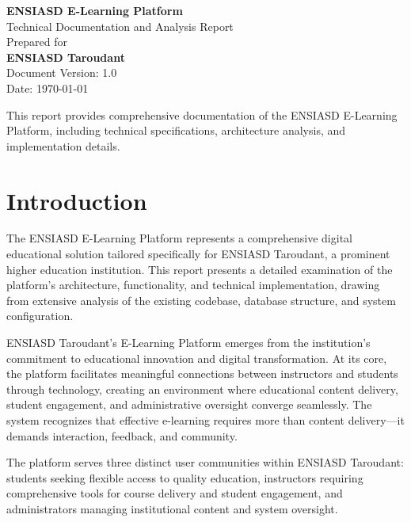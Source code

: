 \documentclass[12pt,a4paper]{article}
\begin{document}
\begin{titlepage}
    \centering
    \vspace*{2cm}
    
    {\Huge\bfseries ENSIASD E-Learning Platform}\\[0.5cm]
    {\Large Technical Documentation and Analysis Report}\\[2cm]
    
    {\large Prepared for}\\[0.3cm]
    {\Large\bfseries ENSIASD Taroudant}\\[2cm]
    
    {\large Document Version: 1.0}\\[0.5cm]
    {\large Date: \today}\\[3cm]
    
    \vfill
    
    {\large This report provides comprehensive documentation of the ENSIASD E-Learning Platform, including technical specifications, architecture analysis, and implementation details.}
    
\end{titlepage}

\tableofcontents
\newpage

\section{Introduction}

The ENSIASD E-Learning Platform represents a comprehensive digital educational solution tailored specifically for ENSIASD Taroudant, a prominent higher education institution. This report presents a detailed examination of the platform's architecture, functionality, and technical implementation, drawing from extensive analysis of the existing codebase, database structure, and system configuration.

ENSIASD Taroudant's E-Learning Platform emerges from the institution's commitment to educational innovation and digital transformation. At its core, the platform facilitates meaningful connections between instructors and students through technology, creating an environment where educational content delivery, student engagement, and administrative oversight converge seamlessly. The system recognizes that effective e-learning requires more than content delivery—it demands interaction, feedback, and community.

The platform serves three distinct user communities within ENSIASD Taroudant: students seeking flexible access to quality education, instructors requiring comprehensive tools for course delivery and student engagement, and administrators managing institutional content and system oversight.
\end{document}
